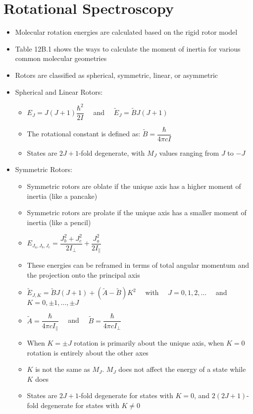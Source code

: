 \documentclass[12pt, openany, letterpaper]{memoir}
\begin{document}
\section{Rotational Spectroscopy}
\begin{itemize}
	\item Molecular rotation energies are calculated based on the rigid rotor model
	\item Table 12B.1 shows the ways to calculate the moment of inertia for various common molecular geometries
	\item Rotors are classified as spherical, symmetric, linear, or asymmetric
	\item Spherical and Linear Rotors:
	\begin{itemize}
		\item $E_J=J(J+1)\dfrac{\hbar^2}{2I}$ ~~and~~ $\tilde{E}_J = \tilde{B}J(J+1)$
		\item The rotational constant is defined as: $\tilde{B}=\dfrac{\hbar}{4\pi cI}$
		\item States are $2J+1$-fold degenerate, with $M_J$ values ranging from $J$ to $-J$
	\end{itemize}
	\item Symmetric Rotors:
	\begin{itemize}
		\item Symmetric rotors are oblate if the unique axis has a higher moment of inertia (like a pancake)
		\item Symmetric rotors are prolate if the unique axis has a smaller moment of inertia (like a pencil)
		\item $E_{J_a,J_b,J_c}=\dfrac{J_b^2+J_c^2}{2I_{\perp}}+\dfrac{J_a^2}{2I_{\parallel}}$
		\item These energies can be reframed in terms of total angular momentum and the projection onto the principal axis
		\item $\tilde{E}_{J,K}=\tilde{B}J(J+1)+\left(\tilde{A}-\tilde{B}\right)K^2$ ~~with~~ $J=0,1,2,\ldots$ ~~and~~ $K = 0, \pm 1, \ldots , \pm J$
		\item $\tilde{A}=\dfrac{\hbar}{4\pi cI_{\parallel}}$ ~~and~~ $\tilde{B} = \dfrac{\hbar}{4\pi cI_{\perp}}$
		\item When $K=\pm J$ rotation is primarily about the unique axis, when $K=0$ rotation is entirely about the other axes
		\item $K$ is not the same as $M_J$. $M_J$ does not affect the energy of a state while $K$ does
		\item States are $2J+1$-fold degenerate for states with $K=0$, and $2(2J+1)$-fold degenerate for states with $K\neq0$

\end{itemize}
\end{itemize}
\end{document}
